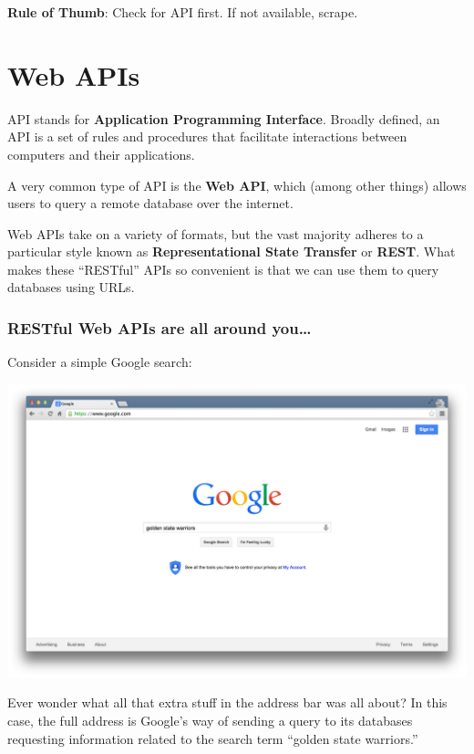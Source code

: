 \documentclass[]{book}
\begin{document}
\textbf{Rule of Thumb}: Check for API first. If not available, scrape.

\hypertarget{web-apis}{\section{Web APIs}\label{web-apis}}

API stands for \textbf{Application Programming Interface}. Broadly
defined, an API is a set of rules and procedures that facilitate
interactions between computers and their applications.

A very common type of API is the \textbf{Web API}, which (among other
things) allows users to query a remote database over the internet.

Web APIs take on a variety of formats, but the vast majority adheres to
a particular style known as \textbf{Representational State Transfer} or
\textbf{REST}. What makes these ``RESTful'' APIs so convenient is that
we can use them to query databases using URLs.

\subsubsection*{RESTful Web APIs are all around
you\ldots{}}\label{restful-web-apis-are-all-around-you}

Consider a simple Google search:

\begin{center}\includegraphics[width=0.7\linewidth]{img/google_search} \end{center}

Ever wonder what all that extra stuff in the address bar was all about?
In this case, the full address is Google's way of sending a query to its
databases requesting information related to the search term ``golden
state warriors.''
\end{document}
